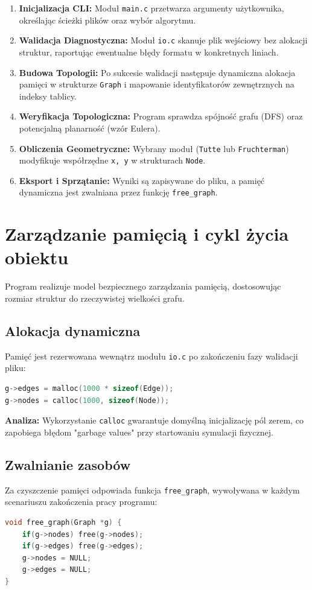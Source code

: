 \documentclass[12pt,a4paper]{article}
\begin{document}
\begin{enumerate}
    \item \textbf{Inicjalizacja CLI:} Moduł \texttt{main.c} przetwarza argumenty użytkownika, określając ścieżki plików oraz wybór algorytmu.
    \item \textbf{Walidacja Diagnostyczna:} Moduł \texttt{io.c} skanuje plik wejściowy bez alokacji struktur, raportując ewentualne błędy formatu w konkretnych liniach.
    \item \textbf{Budowa Topologii:} Po sukcesie walidacji następuje dynamiczna alokacja pamięci w strukturze \texttt{Graph} i mapowanie identyfikatorów zewnętrznych na indeksy tablicy.
    \item \textbf{Weryfikacja Topologiczna:} Program sprawdza spójność grafu (DFS) oraz potencjalną planarność (wzór Eulera).
    \item \textbf{Obliczenia Geometryczne:} Wybrany moduł (\texttt{Tutte} lub \texttt{Fruchterman}) modyfikuje współrzędne \texttt{x, y} w strukturach \texttt{Node}.
    \item \textbf{Eksport i Sprzątanie:} Wyniki są zapisywane do pliku, a pamięć dynamiczna jest zwalniana przez funkcję \texttt{free\_graph}.
\end{enumerate}

\section{Zarządzanie pamięcią i cykl życia obiektu}
Program realizuje model bezpiecznego zarządzania pamięcią, dostosowując rozmiar struktur do rzeczywistej wielkości grafu.

\subsection{Alokacja dynamiczna}
Pamięć jest rezerwowana wewnątrz modułu \texttt{io.c} po zakończeniu fazy walidacji pliku:
\begin{lstlisting}[language=C, caption={Alokacja w funkcji read\_graph}]
g->edges = malloc(1000 * sizeof(Edge)); 
g->nodes = calloc(1000, sizeof(Node));
\end{lstlisting}
\textbf{Analiza:} Wykorzystanie \texttt{calloc} gwarantuje domyślną inicjalizację pól zerem, co zapobiega błędom "garbage values" przy startowaniu symulacji fizycznej.

\subsection{Zwalnianie zasobów}
Za czyszczenie pamięci odpowiada funkcja \texttt{free\_graph}, wywoływana w każdym scenariuszu zakończenia pracy programu:
\begin{lstlisting}[language=C, caption={Funkcja zwalniająca miejsce w pamięci}]
void free_graph(Graph *g) {
    if(g->nodes) free(g->nodes);
    if(g->edges) free(g->edges);
    g->nodes = NULL; 
    g->edges = NULL;
}
\end{lstlisting}
\end{document}
